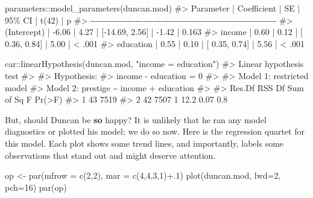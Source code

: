 \documentclass[
  letterpaper,
  10pt,
  krantz2]{krantz}
\makeatletter
\newenvironment{Shaded}{\begin{snugshade}}{\end{snugshade}}
\newcommand{\AttributeTok}[1]{\textcolor[rgb]{0.40,0.45,0.13}{#1}}
\newcommand{\CommentTok}[1]{\textcolor[rgb]{0.37,0.37,0.37}{#1}}
\newcommand{\DecValTok}[1]{\textcolor[rgb]{0.68,0.00,0.00}{#1}}
\newcommand{\FunctionTok}[1]{\textcolor[rgb]{0.28,0.35,0.67}{#1}}
\newcommand{\NormalTok}[1]{\textcolor[rgb]{0.00,0.23,0.31}{#1}}
\newcommand{\OtherTok}[1]{\textcolor[rgb]{0.00,0.23,0.31}{#1}}
\newcommand{\SpecialCharTok}[1]{\textcolor[rgb]{0.37,0.37,0.37}{#1}}
\newcommand{\StringTok}[1]{\textcolor[rgb]{0.13,0.47,0.30}{#1}}
\newenvironment{kframe}{%
  \medskip{}
  \setlength{\fboxsep}{.8em}
  \def\at@end@of@kframe{}%
  \ifinner\ifhmode%
  \def\at@end@of@kframe{\end{minipage}}%
  \begin{minipage}{\columnwidth}%
  \fi\fi%
  \def\FrameCommand##1{\hskip\@totalleftmargin \hskip-\fboxsep
  \colorbox{shadecolor}{##1}\hskip-\fboxsep
      \hskip-\linewidth \hskip-\@totalleftmargin \hskip\columnwidth}%
  \MakeFramed {\advance\hsize-\width
    \@totalleftmargin\z@ \linewidth\hsize
    \@setminipage}}%
{\par\unskip\endMakeFramed%
  \at@end@of@kframe}
\renewenvironment{Shaded}{\begin{kframe}}{\end{kframe}}
\makeatother
\begin{document}
\begin{Shaded}
\begin{Highlighting}[]
\NormalTok{parameters}\SpecialCharTok{::}\FunctionTok{model\_parameters}\NormalTok{(duncan.mod)}
\CommentTok{\#\textgreater{} Parameter   | Coefficient |   SE |         95\% CI | t(42) |      p}
\CommentTok{\#\textgreater{} {-}{-}{-}{-}{-}{-}{-}{-}{-}{-}{-}{-}{-}{-}{-}{-}{-}{-}{-}{-}{-}{-}{-}{-}{-}{-}{-}{-}{-}{-}{-}{-}{-}{-}{-}{-}{-}{-}{-}{-}{-}{-}{-}{-}{-}{-}{-}{-}{-}{-}{-}{-}{-}{-}{-}{-}{-}{-}{-}{-}{-}{-}{-}{-}{-}{-}}
\CommentTok{\#\textgreater{} (Intercept) |       {-}6.06 | 4.27 | [{-}14.69, 2.56] | {-}1.42 | 0.163 }
\CommentTok{\#\textgreater{} income      |        0.60 | 0.12 | [  0.36, 0.84] |  5.00 | \textless{} .001}
\CommentTok{\#\textgreater{} education   |        0.55 | 0.10 | [  0.35, 0.74] |  5.56 | \textless{} .001}

\NormalTok{car}\SpecialCharTok{::}\FunctionTok{linearHypothesis}\NormalTok{(duncan.mod, }\StringTok{"income = education"}\NormalTok{)}
\CommentTok{\#\textgreater{} Linear hypothesis test}
\CommentTok{\#\textgreater{} }
\CommentTok{\#\textgreater{} Hypothesis:}
\CommentTok{\#\textgreater{} income {-} education = 0}
\CommentTok{\#\textgreater{} }
\CommentTok{\#\textgreater{} Model 1: restricted model}
\CommentTok{\#\textgreater{} Model 2: prestige \textasciitilde{} income + education}
\CommentTok{\#\textgreater{} }
\CommentTok{\#\textgreater{}   Res.Df  RSS Df Sum of Sq    F Pr(\textgreater{}F)}
\CommentTok{\#\textgreater{} 1     43 7519                         }
\CommentTok{\#\textgreater{} 2     42 7507  1      12.2 0.07    0.8}
\end{Highlighting}
\end{Shaded}

But, should Duncan be \textbf{so} happy? It is unlikely that he ran any
model diagnostics or plotted his model; we do so now. Here is the
regression quartet for this model. Each plot shows some trend lines, and
importantly, labels some observations that stand out and might deserve
attention.

\begin{Shaded}
\begin{Highlighting}[]
\NormalTok{op }\OtherTok{\textless{}{-}} \FunctionTok{par}\NormalTok{(}\AttributeTok{mfrow =} \FunctionTok{c}\NormalTok{(}\DecValTok{2}\NormalTok{,}\DecValTok{2}\NormalTok{), }
          \AttributeTok{mar =} \FunctionTok{c}\NormalTok{(}\DecValTok{4}\NormalTok{,}\DecValTok{4}\NormalTok{,}\DecValTok{3}\NormalTok{,}\DecValTok{1}\NormalTok{)}\SpecialCharTok{+}\NormalTok{.}\DecValTok{1}\NormalTok{)}
\FunctionTok{plot}\NormalTok{(duncan.mod, }\AttributeTok{lwd=}\DecValTok{2}\NormalTok{, }\AttributeTok{pch=}\DecValTok{16}\NormalTok{)}
\FunctionTok{par}\NormalTok{(op)}
\end{Highlighting}
\end{Shaded}
\end{document}
